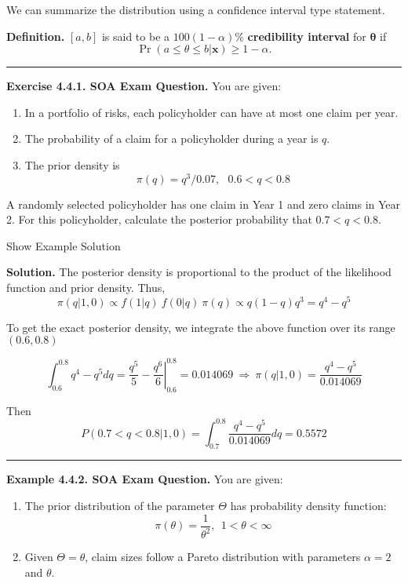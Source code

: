 \documentclass[]{book}
\providecommand{\tightlist}{%
  \setlength{\itemsep}{0pt}\setlength{\parskip}{0pt}}
\theoremstyle{definition}
\theoremstyle{definition}
\theoremstyle{definition}
\theoremstyle{remark}
\begin{document}
We can summarize the distribution using a confidence interval type
statement.

\textbf{Definition.} \([a,b]\) is said to be a \(100(1-\alpha)\%\)
\textbf{credibility interval} for \(\boldsymbol \theta\) if
\[\Pr (a \le \theta \le b | \mathbf{x}) \ge 1- \alpha.\]

\begin{center}\rule{0.5\linewidth}{\linethickness}\end{center}

\textbf{Exercise 4.4.1. SOA Exam Question.} You are given:

\begin{enumerate}
\def\labelenumi{(\roman{enumi})}
\tightlist
\item
  In a portfolio of risks, each policyholder can have at most one claim
  per year.
\item
  The probability of a claim for a policyholder during a year is \(q\).
\item
  The prior density is \[\pi(q) = q^3/0.07, \ \ \ 0.6 < q < 0.8\]
\end{enumerate}

A randomly selected policyholder has one claim in Year 1 and zero claims
in Year 2. For this policyholder, calculate the posterior probability
that \(0.7 < q < 0.8\).

Show Example Solution

\hypertarget{toggleExampleSelect.4.1}{}
\textbf{Solution.} The posterior density is proportional to the product
of the likelihood function and prior density. Thus,
\[\pi(q|1,0) \propto f(1|q)\ f(0|q)\ \pi(q) \propto q(1-q)q^3 = q^4-q^5\]

To get the exact posterior density, we integrate the above function over
its range \((0.6, 0.8)\)

\[\int_{0.6}^{0.8} q^4-q^5 dq = \frac{q^5}{5} - \left. \frac{q^6}{6} \right|_{0.6}^{0.8} = 0.014069 \ \Rightarrow \ \pi(q|1,0)=\frac{q^4-q^5}{0.014069}\]

Then
\[P(0.7<q<0.8|1,0)= \int_{0.7}^{0.8} \frac{q^4-q^5}{0.014069}dq = 0.5572\]

\begin{center}\rule{0.5\linewidth}{\linethickness}\end{center}

\textbf{Example 4.4.2. SOA Exam Question.} You are given:

\begin{enumerate}
\def\labelenumi{(\roman{enumi})}
\tightlist
\item
  The prior distribution of the parameter \(\Theta\) has probability
  density function:
  \[\pi(\theta) = \frac{1}{\theta^2}, \ \ 1 < \theta < \infty\]
\item
  Given \(\Theta = \theta\), claim sizes follow a Pareto distribution
  with parameters \(\alpha=2\) and \(\theta\).
\end{enumerate}
\end{document}

